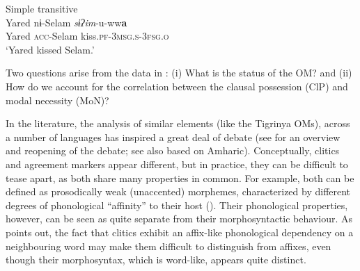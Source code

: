 \documentclass[output=paper]{langscibook}
\begin{document}
\ea\label{ex:Gebregziabher:trans} Simple transitive \\
\gll Yared nɨ-Selam \textit{sɨʔim}-u-ww\textbf{a} \\
Yared {\scshape acc-}Selam kiss.{\scshape pf-3msg.s-3fsg.o}\\
\glt `Yared kissed Selam.'
\z\largerpage

\noindent Two questions arise from the data in : (i) What is the status of the OM? and (ii) How do we account for the correlation between the clausal possession (ClP) and modal necessity (MoN)?

\begin{sloppypar}
In the literature, the analysis of similar elements (like the Tigrinya OMs), across a number of languages has inspired a great deal of debate (see \citealt{nevins11a}  for an overview and reopening of the debate; see also \citealt{kramer14} based on Amharic). Conceptually, clitics and agreement markers appear different, but in practice, they can be difficult to tease apart, as both share many properties in common. For example, both can be defined as prosodically weak (unaccented) morphemes, characterized by different degrees of phonological ``affinity'' to their host (\citealt{stump01}). Their phonological properties, however, can be seen as quite separate from their morphosyntactic behaviour. As \citet[16]{stump01} points out, the fact that clitics exhibit an affix-like phonological dependency on a neighbouring word may make them difficult to distinguish from affixes, even though their morphosyntax, which is word-like, appears quite distinct.


\end{sloppypar}
\end{document}
